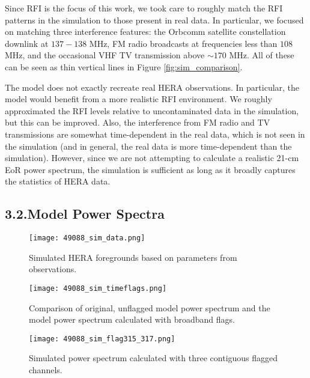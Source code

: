 \documentclass[12pt]{article}
\begin{document}
Since RFI is the focus of this work, we took care to roughly match the RFI patterns in the simulation to those present in real data. In particular, we focused on matching three interference features: the Orbcomm satellite constellation downlink at $137 - 138$ MHz, FM radio broadcasts at frequencies less than $108$ MHz, and the occasional VHF TV transmission above $\sim 170$ MHz. All of these can be seen as thin vertical lines in Figure \ref{fig:sim_comparison}.

The model does not exactly recreate real HERA observations. In particular, the model would benefit from a more realistic RFI environment. We roughly approximated the RFI levels relative to uncontaminated data in the simulation, but this can be improved. Also, the interference from FM radio and TV transmissions are somewhat time-dependent in the real data, which is not seen in the simulation (and in general, the real data is more time-dependent than the simulation). However, since we are not attempting to calculate a realistic 21-cm EoR power spectrum, the simulation is sufficient as long as it broadly captures the statistics of HERA data. \vspace{3mm}

\tocless\subsection{\hypertarget{subsec:simtests}{3.2.\hspace{0.75em}Model Power Spectra}}

\begin{figure}[t]
	\centering
	\texttt{[image: 49088\_sim\_data.png]}
	\caption[Model data]{Simulated HERA foregrounds based on parameters from observations.}
	\label{fig:sim_data}
\end{figure}

\begin{figure}[p]
	\centering
	\texttt{[image: 49088\_sim\_timeflags.png]}
	\caption[Model power spectrum calculated with data flagged only in time]{Comparison of original, unflagged model power spectrum and the model power spectrum calculated with broadband flags.}
	\label{fig:sim_time_flags}
\end{figure}

\begin{figure}[p]
	\centering
	\texttt{[image: 49088\_sim\_flag315\_317.png]}
	\caption[Model power spectrum calculated with flagged time integrations and three contiguous flagged channels]{Simulated power spectrum calculated with three contiguous flagged channels.}
	\label{fig:sim_flag_chan315_317}
\end{figure}
\end{document}
